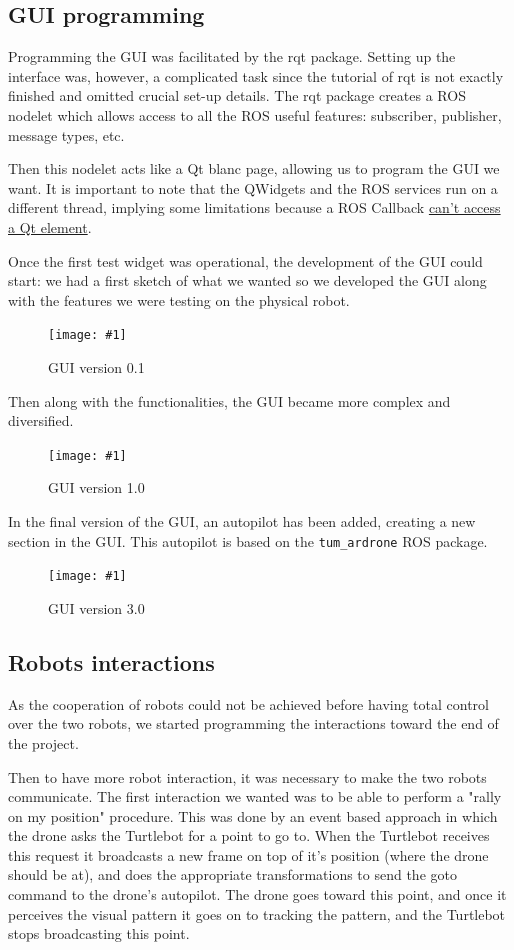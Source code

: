 \documentclass[11pt,a4paper]{article}
\newcommand{\centerFigure}[2]{
\begin{figure}[h]	
\centering
\texttt{[image: \#1]}
\caption{#2}
\end{figure}
}
\begin{document}
\subsection{GUI programming}
Programming the GUI was facilitated by the rqt package. Setting up the interface was, however,
 a complicated task since the tutorial of rqt is not exactly finished and omitted crucial set-up details. The rqt package creates a ROS nodelet which allows access to
all the ROS useful features: subscriber, publisher, message types, etc.

Then this nodelet acts like a Qt blanc page, allowing us to program the GUI we want. It is 
important to note that the QWidgets and the ROS services run on a different thread, implying some limitations because a ROS Callback
\href{http://wiki.ros.org/rqt/Tutorials/Writing\%20a\%20C\%2B\%2B\%20Plugin}
{can't access a Qt element}.

Once the first test widget was operational, the development of the GUI could start: we had a 
first sketch of what we wanted so we developed the GUI along with the features we were
testing on the physical robot.
\centerFigure{guiSketch.png}{GUI version 0.1}

Then along with the functionalities, the GUI became more complex and diversified.
\centerFigure{guiV2.png}{GUI version 1.0}

In the final version of the GUI, an autopilot has been added, creating a new section in the 
GUI. This autopilot is based on the \verb!tum_ardrone! ROS package.
\centerFigure{guiV3.png}{GUI version 3.0}

\subsection{Robots interactions}


As the cooperation of robots could not be achieved before having total control over the two robots, 
we started programming the interactions toward the end of the project.

Then to have more robot interaction, it was necessary to make the two robots communicate.
The first interaction we wanted was to be able to perform a "rally on my position" procedure.
This was done by an event based approach in which the drone asks the Turtlebot for a point to go to. When the Turtlebot receives this request it broadcasts a new frame on top of it's position (where the drone should be at), and does the appropriate transformations to send the goto command to the drone's autopilot. The drone goes toward this point, and once it perceives the visual pattern it goes on to tracking the pattern, and the Turtlebot stops broadcasting this point.
\end{document}
